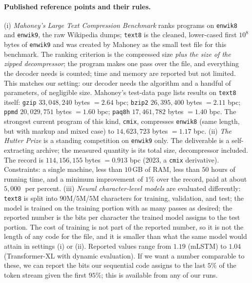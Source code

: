 \documentclass[11pt]{article}
\begin{document}
\paragraph{Published reference points and their rules.}
(i) \emph{Mahoney's Large Text Compression Benchmark} ranks programs
on \texttt{enwik8} and \texttt{enwik9}, the raw Wikipedia dumps;
\texttt{text8} is the cleaned, lower-cased first $10^8$ bytes of
\texttt{enwik9} and was created by Mahoney as the small test file for
this benchmark.  The ranking criterion is the compressed size
\emph{plus the size of the zipped decompressor}; the program makes
one pass over the file, and everything the decoder needs is counted;
time and memory are reported but not limited.  This matches our
setting: our decoder needs the algorithm and a handful of parameters,
of negligible size.  Mahoney's test-data page lists results on
\texttt{text8} itself: \texttt{gzip} $33{,}048{,}240$ bytes $= 2.64$
bpc; \texttt{bzip2} $26{,}395{,}400$ bytes $= 2.11$ bpc;
\texttt{ppmd} $20{,}029{,}751$ bytes $= 1.60$ bpc; \texttt{paq8h}
$17{,}461{,}782$ bytes $= 1.40$ bpc.  The strongest current program
of this kind, \texttt{cmix}, compresses \texttt{enwik8} (same length,
but with markup and mixed case) to $14{,}623{,}723$ bytes $= 1.17$
bpc.
(ii) \emph{The Hutter Prize} is a standing competition on
\texttt{enwik9} only.  The deliverable is a self-extracting archive;
the measured quantity is its total size, decompressor included.  The
record is $114{,}156{,}155$ bytes $= 0.913$ bpc (2023, a \texttt{cmix}
derivative).  Constraints: a single machine, less than $10$\,GB of
RAM, less than $50$ hours of running time, and a minimum improvement
of $1\%$ over the record, paid at about $5{,}000$\,\texteuro\ per
percent.
(iii) \emph{Neural character-level models} are evaluated differently:
\texttt{text8} is split into $90$M/$5$M/$5$M characters for
training, validation, and test; the model is trained on the training
portion with as many passes as desired; the reported number is the
bits per character the trained model assigns to the test portion.
The cost of training is not part of the reported number, so it is not
the length of any code for the file, and it is smaller than what the
same model would attain in settings (i) or (ii).  Reported values
range from $1.19$ (mLSTM) to $1.04$ (Transformer-XL with dynamic
evaluation).  If we want a number comparable to these, we can report
the bits our sequential code assigns to the last $5\%$ of the token
stream given the first $95\%$; this is available from any of our
runs.
\end{document}
